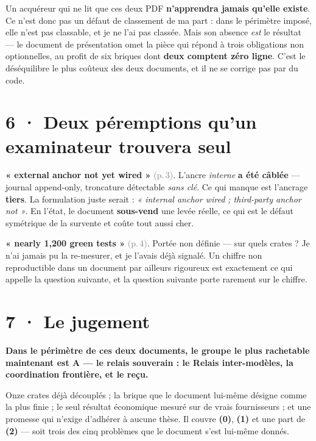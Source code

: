 \documentclass[10pt]{article}
\newcommand{\sz}[1]{\textcolor{grey}{\small\textsf{#1}}}
\begin{document}
Un acquéreur qui ne lit que ces deux PDF \textbf{n'apprendra jamais qu'elle existe}. Ce n'est donc pas
un défaut de classement de ma part : dans le périmètre imposé, elle n'est pas classable, et je ne l'ai
pas classée. Mais son absence \emph{est} le résultat --- le document de présentation omet la pièce qui
répond à trois obligations non optionnelles, au profit de six briques dont \textbf{deux comptent zéro
ligne}. C'est le déséquilibre le plus coûteux des deux documents, et il ne se corrige pas par du code.

\section{6 · Deux péremptions qu'un examinateur trouvera seul}

\textbf{« external anchor not yet wired »} \sz{(p.\,3)}. L'ancre \emph{interne} \textbf{a été câblée} ---
journal append-only, troncature détectable \emph{sans clé}. Ce qui manque est l'ancrage \textbf{tiers}.
La formulation juste serait : \emph{« internal anchor wired ; third-party anchor not »}. En l'état, le
document \textbf{sous-vend} une levée réelle, ce qui est le défaut symétrique de la survente et coûte
tout aussi cher.

\textbf{« nearly 1,200 green tests »} \sz{(p.\,4)}. Portée non définie --- sur quels crates ? Je n'ai
jamais pu la re-mesurer, et je l'avais déjà signalé. Un chiffre non reproductible dans un document par
ailleurs rigoureux est exactement ce qui appelle la question suivante, et la question suivante porte
rarement sur le chiffre.

\section{7 · Le jugement}

\begin{acquis}
\textbf{Dans le périmètre de ces deux documents, le groupe le plus rachetable maintenant est A --- le
relais souverain : le Relais inter-modèles, la coordination frontière, et le reçu.}
\end{acquis}

Onze crates déjà découplés ; la brique que le document lui-même désigne comme la plus finie ; le seul
résultat économique mesuré sur de vrais fournisseurs ; et une promesse qui n'exige d'adhérer à aucune
thèse. Il couvre \textbf{(0)}, \textbf{(1)} et une part de \textbf{(2)} --- soit trois des cinq
problèmes que le document s'est lui-même donnés.
\end{document}
